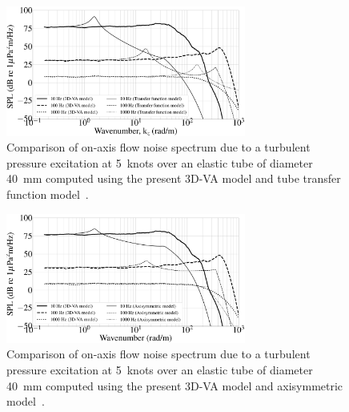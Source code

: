 \documentclass[twocolumn,10pt]{asme2ej}
\begin{document}
\begin{figure}[h]
    \centering
    \includegraphics[width=3.1in]{figure/Inside_pressure_comparison_3d_and_approx.eps}
    \caption{Comparison of on-axis flow noise spectrum due to a turbulent pressure excitation at 5~knots over an elastic tube of diameter 40~mm computed using the present 3D-VA model and tube transfer function model~\cite{knight1996}.} 
    \label{3d vs approx}
\end{figure}
\begin{figure}[h]
    \centering
    \includegraphics[width=3.1in]{figure/Inside_pressure_comparison_3d_and_axi.eps}
    \caption{Comparison of on-axis flow noise spectrum due to a turbulent pressure excitation at 5~knots over an elastic tube of diameter 40~mm computed using the present 3D-VA model and axisymmetric model~\cite{jineesh2013}.}
    \label{3d vs axi}
\end{figure}
\end{document}
